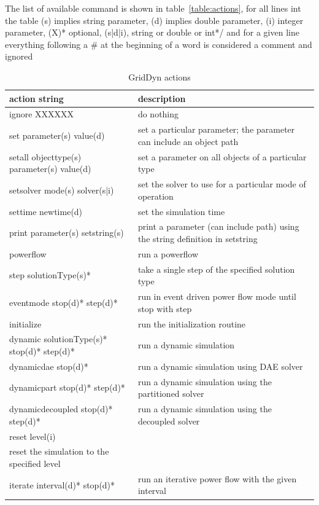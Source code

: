 \documentclass[12pt]{article} %
\begin{document}
The list of available command is shown in table~\ref{table:actions}, for all lines int the table
(s) implies string parameter,  (d) implies double parameter,  (i) integer parameter, (X)* optional, (s|d|i), string or double or int*/
and for a given line everything following a \# at the beginning of a word is considered a comment and ignored
\begin{table}[ht]
	
	\caption{GridDyn actions} %
	\centering %
	\begin{tabular}{l p{7cm}} %
		\hline %
		action string & description \\ [0.5ex] %
		\hline %
	ignore XXXXXX & do nothing \\
	set parameter(s) value(d) & set a particular parameter;  the parameter can include an object path \\
	setall  objecttype(s) parameter(s) value(d) & set a parameter on all objects of a particular type \\ 
	setsolver mode(s) solver(s|i) & set the solver to use for a particular mode of operation \\
	settime newtime(d) &  set the simulation time \\
	print parameter(s) setstring(s) &  print a parameter (can include path) using the string definition in setstring \\
	powerflow & run a powerflow \\
	step solutionType(s)* & take a single step of the specified solution type \\
	eventmode stop(d)*  step(d)* & run in event driven power flow mode until stop with step \\
	initialize & 	run the initialization routine \\
	dynamic solutionType(s)* stop(d)* step(d)* &  run a dynamic simulation \\
	dynamicdae stop(d)*  &  run a dynamic simulation using DAE solver \\
	dynamicpart stop(d)* step(d)* & run a dynamic simulation using the partitioned solver \\
	dynamicdecoupled stop(d)* step(d)* & run a dynamic simulation using the decoupled solver \\
	reset level(i) & \\  reset the simulation to the specified level \\
	iterate interval(d)* stop(d)* &  run an iterative power flow with the given interval \\

\end{tabular}
\end{table}
\end{document}
